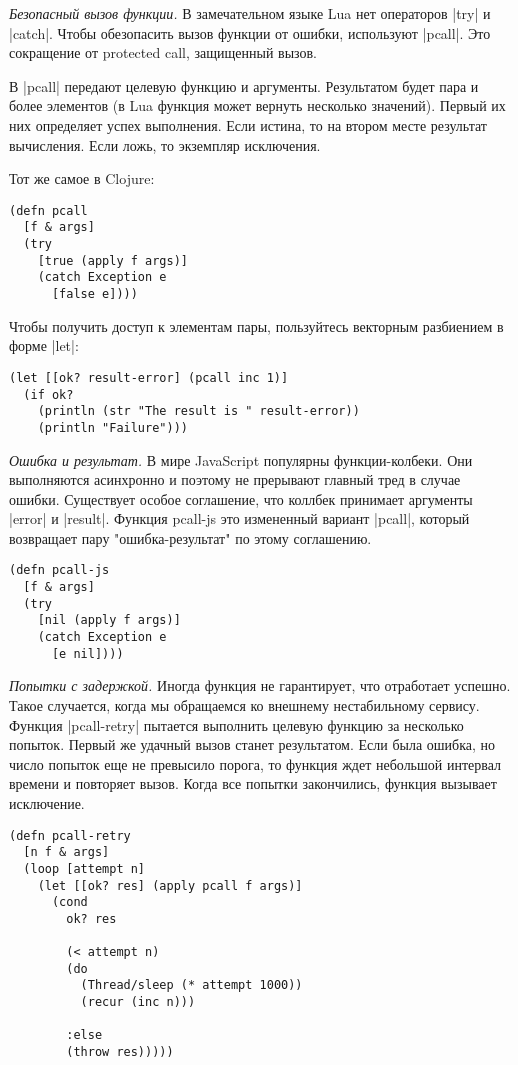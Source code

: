 \emph{Безопасный вызов функции.} В замечательном языке Lua нет операторов \spverb|try| и
\spverb|catch|. Чтобы обезопасить вызов функции от ошибки, используют \spverb|pcall|. Это
сокращение от protected call, защищенный вызов.

В \spverb|pcall| передают целевую функцию и аргументы. Результатом будет пара и более
элементов (в Lua функция может вернуть несколько значений). Первый их них
определяет успех выполнения. Если истина, то на втором месте результат
вычисления. Если ложь, то экземпляр исключения.

Тот же самое в Clojure:

\begin{verbatim}
(defn pcall
  [f & args]
  (try
    [true (apply f args)]
    (catch Exception e
      [false e])))
\end{verbatim}

Чтобы получить доступ к элементам пары, пользуйтесь векторным разбиением в форме
\spverb|let|:

\begin{verbatim}
(let [[ok? result-error] (pcall inc 1)]
  (if ok?
    (println (str "The result is " result-error))
    (println "Failure")))
\end{verbatim}

\emph{Ошибка и результат.} В мире JavaScript популярны функции-колбеки. Они
выполняются асинхронно и поэтому не прерывают главный тред в случае
ошибки. Существует особое соглашение, что коллбек принимает аргументы \spverb|error| и
\spverb|result|. Функция pcall-js это измененный вариант \spverb|pcall|, который возвращает
пару "ошибка-результат" по этому соглашению.

\begin{verbatim}
(defn pcall-js
  [f & args]
  (try
    [nil (apply f args)]
    (catch Exception e
      [e nil])))
\end{verbatim}

\emph{Попытки с задержкой.} Иногда функция не гарантирует, что отработает
успешно. Такое случается, когда мы обращаемся ко внешнему нестабильному
сервису. Функция \spverb|pcall-retry| пытается выполнить целевую функцию за несколько
попыток. Первый же удачный вызов станет результатом. Если была ошибка, но число
попыток еще не превысило порога, то функция ждет небольшой интервал времени и
повторяет вызов. Когда все попытки закончились, функция вызывает исключение.

\begin{verbatim}
(defn pcall-retry
  [n f & args]
  (loop [attempt n]
    (let [[ok? res] (apply pcall f args)]
      (cond
        ok? res

        (< attempt n)
        (do
          (Thread/sleep (* attempt 1000))
          (recur (inc n)))

        :else
        (throw res)))))
\end{verbatim}

